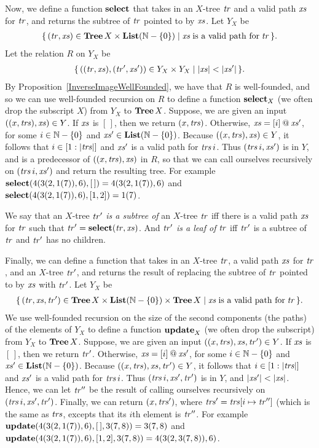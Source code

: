 Now, we define a function $\mathbf{select}$ that takes in an $X$-tree ${\it tr}$ and
a valid path ${\it xs}$ for ${\it tr}$, and returns the subtree of
${\it tr}$ pointed to by ${\it xs}$.
Let $Y_X$ be
\begin{gather*}
\setof{(\tr,\xs)\in\Tree\,X\times\List(\nats-\{0\})}%
{\xs\eqtxt{is a valid path for}\tr} .
\end{gather*}
Let the relation
$R$ on $Y_X$ be
\begin{gather*}
\setof{((\tr,\xs),(\tr',\xs'))\in Y_X\times Y_X}{|\xs|<|\xs'|} .
\end{gather*}
By Proposition~\ref{InverseImageWellFounded}, we have that $R$ is
well-founded, and so we can use well-founded recursion on $R$ to
define a function $\mathbf{select}_X$ (we often drop the subscript $X$) from
$Y_X$ to $\mathbf{Tree}\,X$.  Suppose, we are given an input $((x,{\it trs}),{\it xs})\in
Y$.  If ${\it xs}$ is $[\,]$, then we return $(x,{\it trs})$.  Otherwise,
${\it xs}=[i]\mathbin{@}{\it xs}'$, for some $i\in\mathbb{N}-\{0\}$ and
${\it xs}'\in\mathbf{List}(\mathbb{N}-\{0\})$.  Because $((x,{\it trs}),{\it xs})\in Y$, it
follows that $i\in[1:|{\it trs}|]$ and ${\it xs}'$ is a valid path for
${\it trs}\,i$.  Thus $({\it trs}\,i, {\it xs}')$ is in $Y$, and is a predecessor of
$((x,{\it trs}),{\it xs})$ in $R$, so that we can call ourselves recursively on
$({\it trs}\,i, {\it xs}')$ and return the resulting tree.  For example
$\mathbf{select}(4(3(2,1(7)),6), [\,]) = 4(3(2,1(7)),6)$ and
$\mathbf{select}(4(3(2,1(7)),6),[1,2]) = 1(7)$.

We say that an $X$-tree ${\it tr}'$ \emph{is a subtree of} an $X$-tree
${\it tr}$ iff there is a valid path ${\it xs}$ for ${\it tr}$ such that
${\it tr}'=\mathbf{select}({\it tr},{\it xs})$.  And ${\it tr}'$ \emph{is a leaf of} ${\it tr}$
iff ${\it tr}'$ is a subtree of ${\it tr}$ and ${\it tr}'$ has no children.

Finally, we can define a function that takes in an $X$-tree ${\it tr}$,
a valid path ${\it xs}$ for ${\it tr}$, and an $X$-tree ${\it tr}'$, and
returns the result of replacing the subtree of ${\it tr}$ pointed
to by ${\it xs}$ with ${\it tr}'$.
Let $Y_X$ be
\begin{gather*}
\setof{(\tr,\xs,\tr')
\in\Tree\,X\times\List(\nats-\{0\})\times\Tree\,X}%
{\xs\eqtxt{is a valid path for}\tr} .
\end{gather*}
We use well-founded recursion on the size of the second components
(the paths) of the elements of $Y_X$ to define a function $\mathbf{update}_X$
(we often drop the subscript) from $Y_X$ to $\mathbf{Tree}\,X$.
Suppose, we are given an input $((x,{\it trs}),{\it xs},{\it tr}')\in Y$.  If
${\it xs}$ is $[\,]$, then we return ${\it tr}'$.  Otherwise,
${\it xs}=[i]\mathbin{@}{\it xs}'$, for some $i\in\mathbb{N}-\{0\}$ and
${\it xs}'\in\mathbf{List}(\mathbb{N}-\{0\})$.  Because $((x,{\it trs}),{\it xs},{\it tr}')\in Y$,
it follows that $i\in[1:|{\it trs}|]$ and ${\it xs}'$ is a valid path
for ${\it trs}\,i$.  Thus $({\it trs}\,i, {\it xs}', {\it tr}')$ is in $Y$, and
$|\xs'|<|\xs|$.  Hence, we can let ${\it tr}''$ be the result of
calling ourselves recursively on $({\it trs}\,i, {\it xs}', {\it tr}')$.
Finally, we can return $(x,{\it trs}')$, where ${\it trs}'=
{\it trs}[i\mapsto{\it tr}'']$ (which is the same as ${\it trs}$, excepts that
its $i$th element is ${\it tr}''$.
For example $\mathbf{update}(4(3(2,1(7)),6), [\,], 3(7,8)) = 3(7,8)$ and
$\mathbf{update}(4(3(2,1(7)),6), [1,2], 3(7,8)) =
4(3(2,3(7,8)),6)$.

